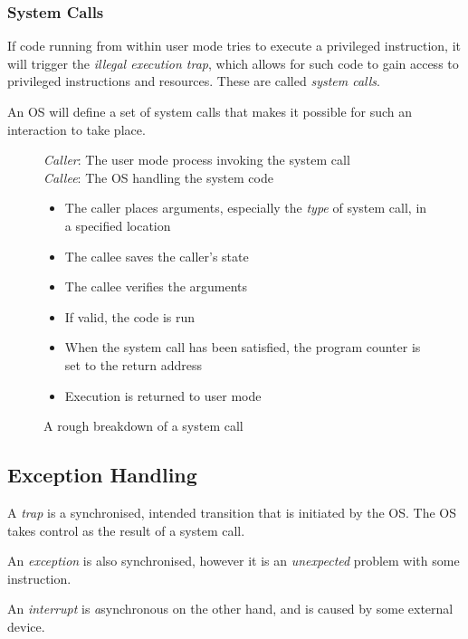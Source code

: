 \documentclass[a4]{article}
\begin{document}
\subsubsection{System Calls}

If code running from within user mode tries to execute a privileged instruction, it will trigger the \textit{illegal execution trap}, which allows for such code to gain access to privileged instructions and resources. These are called \textit{system calls}.

An OS will define a set of system calls that makes it possible for such an interaction to take place.

\begin{figure}[H]
  \begin{framed}
    \textit{Caller}: The user mode process invoking the system call\\
    \textit{Callee}: The OS handling the system code\\
    \begin{itemize}
    \item The caller places arguments, especially the \textit{type} of system call, in a specified location
    \item The callee saves the caller's state
    \item The callee verifies the arguments
    \item If valid, the code is run
    \item When the system call has been satisfied, the program counter is set to the return address
    \item Execution is returned to user mode
    \end{itemize}
  \end{framed}
  \caption{A rough breakdown of a system call}
\end{figure}

\subsection{Exception Handling}

A \textit{trap} is a synchronised, intended transition that is initiated by the OS. The OS takes control as the result of a system call.

An \textit{exception} is also synchronised, however it is an \textit{unexpected} problem with some instruction.

An \textit{interrupt} is \textit{a}synchronous on the other hand, and is caused by some external device.
\end{document}
